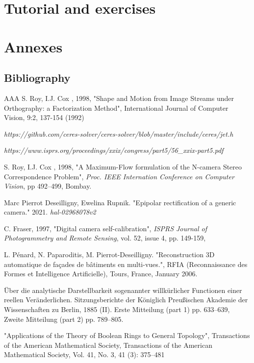 \part{Tutorial and exercises}




\part{Annexes}

\appendix

\chapter{Bibliography}


\begin{thebibliography}{AAA}
      S. Roy, I.J. Cox , 1998, "Shape and Motion from Image 
            Streams under Orthography: a Factorization Method", International Journal of Computer Vision, 
            9:2, 137-154 (1992)


     \emph{https://github.com/ceres-solver/ceres-solver/blob/master/include/ceres/jet.h}

     \emph{https://www.isprs.org/proceedings/xxix/congress/part5/56\_xxix-part5.pdf}

      S. Roy, I.J. Cox , 1998, "A Maximum-Flow
            formulation of the N-camera Stereo Correspondence
      Problem", \emph{Proc. IEEE Internation Conference on
      Computer Vision}, pp 492--499, Bombay.

       Marc Pierrot Deseilligny, Ewelina Rupnik. 
	   "Epipolar rectification of a generic camera." 2021. 
	   \emph{hal-02968078v2}

     C. Fraser, 1997, "Digital camera self-calibration",
   \emph{ISPRS Journal of Photogrammetry and Remote Sensing}, vol. 52, issue 4, pp. 149-159,

      L. Pénard, N. Paparoditis, M. Pierrot-Deseilligny.
           "Reconstruction 3D automatique de façades de bâtiments en multi-vues.",
            RFIA (Reconnaissance des Formes et Intelligence Artificielle),
            Tours, France, January 2006.

     Über die analytische Darstellbarkeit sogenannter willkürlicher Functionen
           einer reellen Veränderlichen. Sitzungsberichte der Königlich Preußischen Akademie der Wissenschaften zu Berlin,
           1885 (II).  Erste Mitteilung (part 1) pp. 633–639, Zweite Mitteilung (part 2) pp. 789–805.

     "Applications of the Theory of Boolean Rings to General Topology",
          Transactions of the American Mathematical Society, Transactions of the American Mathematical Society,
          Vol. 41, No. 3, 41 (3): 375–481

\end{thebibliography}


\printindex








